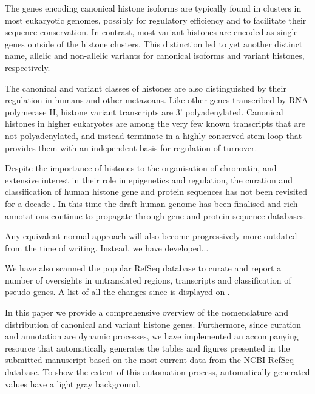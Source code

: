   The genes encoding canonical histone isoforms are typically found in clusters in most eukaryotic
  genomes, possibly for regulatory efficiency and to facilitate their sequence conservation. In
  contrast, most variant histones are encoded as single genes outside of the histone clusters.
  This distinction led to yet another distinct name, allelic and non-allelic variants for
  canonical isoforms and variant histones, respectively\addref{}.

  The canonical and variant classes of histones are also distinguished by their regulation in humans and other
  metazoans. Like other genes transcribed by RNA polymerase II,  histone variant transcripts
  are 3' polyadenylated. Canonical histones in higher eukaryotes are among the very few known transcripts
  that are not polyadenylated, and instead terminate in a highly conserved stem-loop that
  provides them with an independent basis for regulation of turnover.


  Despite the importance of histones to the organisation of chromatin, and extensive interest
  in their role in epigenetics and regulation, the curation and classification of human histone
  gene and protein sequences has not been revisited for a decade \citep{Marzluff02}. In this time
  the draft human genome has been finalised and rich annotations continue to propagate through
  gene and protein sequence databases.

  Any equivalent normal approach will also become progressively more outdated from the
  time of writing. Instead, we have developed...

  We have also scanned the popular RefSeq
  database to curate and report a number of oversights in untranslated regions, transcripts and
  classification of pseudo genes. A list of all the changes since \cite{Marzluff02} is 
  displayed on .

  In this paper we provide a comprehensive overview of the nomenclature and distribution
  of canonical and variant histone genes. Furthermore, since curation and annotation are
  dynamic processes, we have implemented an accompanying resource that automatically generates
  the tables and figures presented in the submitted manuscript based
  on the most current data from the NCBI RefSeq database. To show the extent of this
  automation process, automatically generated values have a light gray background.

